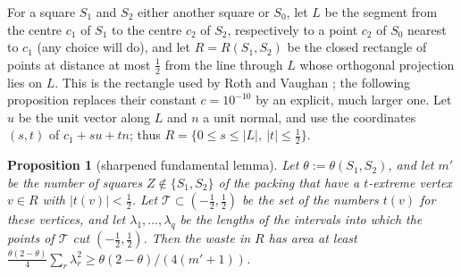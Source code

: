 \documentclass[11pt]{amsart}
\newtheorem{proposition}[theorem]{Proposition}
\theoremstyle{definition}
\theoremstyle{remark}
\begin{document}
For a square $S_1$ and $S_2$ either another square or $S_0$, let
$L$ be the segment from the centre $c_1$ of $S_1$ to the centre $c_2$ of $S_2$, respectively to a point $c_2$ of $S_0$ nearest to
$c_1$ (any choice will do), and let $R=R(S_1,S_2)$ be the closed rectangle of points at distance at most $\frac12$ from the line through $L$ whose
orthogonal projection lies on $L$. This is the rectangle used by Roth and Vaughan \cite[\S3, p.~172]{RV}; the following
proposition replaces their constant $c=10^{-10}$ by an explicit, much larger one. Let $u$ be the unit vector along $L$
and $n$ a unit normal, and use the coordinates $(s,t)$ of $c_1+su+tn$; thus $R=\{0\le s\le|L|,\ |t|\le\frac12\}$.

\begin{proposition}[sharpened fundamental lemma]\label{prop:FL}
Let $\theta:=\theta(S_1,S_2)$, and let $m'$ be the number of squares $Z\notin\{S_1,S_2\}$ of the packing that have a
$t$-extreme vertex $v\in R$ with $|t(v)|<\frac12$. Let $\mathcal T\subset(-\frac12,\frac12)$ be the set of the numbers $t(v)$
for these vertices, and let $\lambda_1,\dots,\lambda_q$ be the lengths of the intervals into which the points of $\mathcal T$
cut $(-\frac12,\frac12)$. Then the waste in $R$ has area at least
$\frac{\theta(2-\theta)}4\sum_r\lambda_r^2\ge\theta(2-\theta)/(4(m'+1))$.
\end{proposition}
\end{document}
